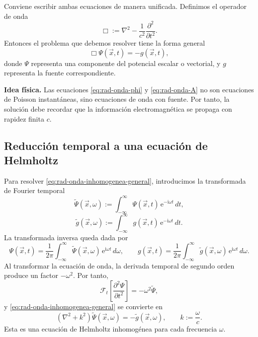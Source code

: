 \documentclass[12pt,a4paper]{article}
\theoremstyle{definition}
\theoremstyle{plain}
\numberwithin{equation}{section}
\theoremstyle{remark}
\newcommand{\ii}{\mathrm{i}}
\newcommand{\ee}{\mathrm{e}}
\begin{document}
Conviene escribir ambas ecuaciones de manera unificada. Definimos el operador de onda
\begin{equation}
    \Box:=\nabla^2-\frac{1}{c^2}\frac{\partial^2}{\partial t^2}.
    \label{eq:rad-box-def}
\end{equation}
Entonces el problema que debemos resolver tiene la forma general
\begin{equation}
    \Box\Psi(\vec x,t)=-g(\vec x,t),
    \label{eq:rad-onda-inhomogenea-general}
\end{equation}
donde $\Psi$ representa una componente del potencial escalar o vectorial, y $g$ representa la fuente correspondiente.

\begin{cajaidea}
\textbf{Idea física.} Las ecuaciones \eqref{eq:rad-onda-phi} y \eqref{eq:rad-onda-A} no son ecuaciones de Poisson instantáneas, sino ecuaciones de onda con fuente. Por tanto, la solución debe recordar que la información electromagnética se propaga con rapidez finita $c$.
\end{cajaidea}

\subsection{Reducción temporal a una ecuación de Helmholtz}
\label{subsec:helmholtz-green-retardados}

Para resolver \eqref{eq:rad-onda-inhomogenea-general}, introducimos la transformada de Fourier temporal
\begin{equation}
    \widetilde{\Psi}(\vec x,\omega):=
    \int_{-\infty}^{\infty}\Psi(\vec x,t)\,\ee^{-\ii\omega t}\,dt,
    \label{eq:rad-fourier-psi}
\end{equation}
\begin{equation}
    \widetilde g(\vec x,\omega):=
    \int_{-\infty}^{\infty}g(\vec x,t)\,\ee^{-\ii\omega t}\,dt.
    \label{eq:rad-fourier-g}
\end{equation}
La transformada inversa queda dada por
\begin{equation}
    \Psi(\vec x,t)=\frac{1}{2\pi}\int_{-\infty}^{\infty}
    \widetilde\Psi(\vec x,\omega)\,\ee^{\ii\omega t}\,d\omega,
    \qquad
    g(\vec x,t)=\frac{1}{2\pi}\int_{-\infty}^{\infty}
    \widetilde g(\vec x,\omega)\,\ee^{\ii\omega t}\,d\omega.
    \label{eq:rad-fourier-inversa}
\end{equation}
Al transformar la ecuación de onda, la derivada temporal de segundo orden produce un factor $-\omega^2$. Por tanto,
\begin{equation*}
    \mathcal F_t\left[\frac{\partial^2\Psi}{\partial t^2}\right]
    =-\omega^2\widetilde\Psi,
\end{equation*}
y \eqref{eq:rad-onda-inhomogenea-general} se convierte en
\begin{equation}
    \left(\nabla^2+k^2\right)\widetilde\Psi(\vec x,\omega)
    =-\widetilde g(\vec x,\omega),
    \qquad
    k:=\frac{\omega}{c}.
    \label{eq:rad-helmholtz-inhomogenea}
\end{equation}
Esta es una ecuación de Helmholtz inhomogénea para cada frecuencia $\omega$.
\end{document}
